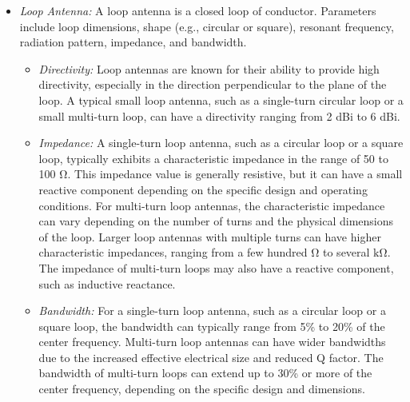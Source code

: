 \documentclass[11pt,a4paper]{article}
\renewcommand{\ohm}{{\mathrm{\Omega}}}
\newcommand{\kiloohm}{{\mathrm{k\Omega}}}
\begin{document}
\begin{itemize}
    \item \emph{Loop Antenna:} A loop antenna is a closed loop of conductor. Parameters include loop dimensions, shape (e.g., circular or square), resonant frequency, radiation pattern, impedance, and bandwidth.
    \begin{itemize}
        \item \emph{Directivity:} Loop antennas are known for their ability to provide high directivity, especially in the direction perpendicular to the plane of the loop. A typical small loop antenna, such as a single-turn circular loop or a small multi-turn loop, can have a directivity ranging from 2 dBi to 6 dBi.
        \item \emph{Impedance:} A single-turn loop antenna, such as a circular loop or a square loop, typically exhibits a characteristic impedance in the range of 50 to 100 $\ohm$. This impedance value is generally resistive, but it can have a small reactive component depending on the specific design and operating conditions. For multi-turn loop antennas, the characteristic impedance can vary depending on the number of turns and the physical dimensions of the loop. Larger loop antennas with multiple turns can have higher characteristic impedances, ranging from a few hundred $\ohm$ to several $\kiloohm$. The impedance of multi-turn loops may also have a reactive component, such as inductive reactance.
        \item \emph{Bandwidth:} For a single-turn loop antenna, such as a circular loop or a square loop, the bandwidth can typically range from 5\% to 20\% of the center frequency. Multi-turn loop antennas can have wider bandwidths due to the increased effective electrical size and reduced Q factor. The bandwidth of multi-turn loops can extend up to 30\% or more of the center frequency, depending on the specific design and dimensions.
    \end{itemize}
    

\end{itemize}
\end{document}
